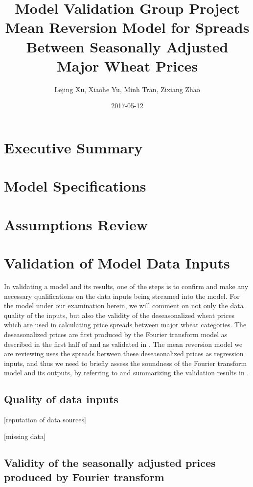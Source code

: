 \documentclass{article}
\title{Model Validation Group Project \\
Mean Reversion Model for Spreads Between Seasonally Adjusted Major Wheat Prices}
\date{2017-05-12}
\author{Lejing Xu, Xiaohe Yu, Minh Tran, Zixiang Zhao}
\begin{document}
\maketitle
\tableofcontents
\newpage

\section{Executive Summary}

\section{Model Specifications}

\section{Assumptions Review}

\section{Validation of Model Data Inputs}

	In validating a model and its results, one of the steps is to confirm and make any necessary qualifications on the data inputs being streamed into the model. For the model under our examination herein, we will comment on not only the data quality of the inputs, but also the validity of the deseasonalized wheat prices which are used in calculating price spreads between major wheat categories. The deseasonalized prices are first produced by the Fourier transform model as described in the first half of \cite{ken93} and as validated in \cite{wang12}. The mean reversion model we are reviewing uses the spreads between these deseasonalized prices as regression inputs, and thus we need to briefly assess the soundness of the Fourier transform model and its outputs, by referring to and summarizing the validation results in \cite{wang12}.

	\subsection{Quality of data inputs}

	[reputation of data sources]

	[missing data]

	\subsection{Validity of the seasonally adjusted prices produced by Fourier transform}
\end{document}
